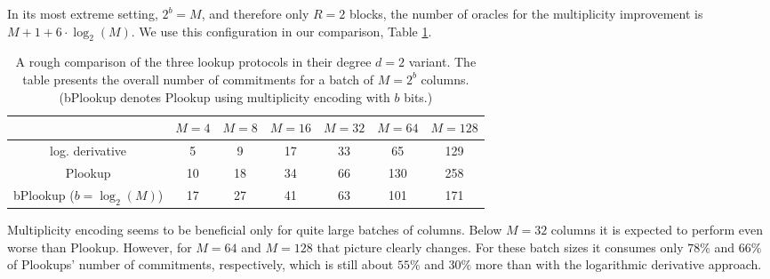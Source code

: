 \documentclass[11pt]{article}
\theoremstyle{definition}
\theoremstyle{definition}
\begin{document}
In its most extreme setting, $2^b = M$, and therefore only $R=2$ blocks, the number of oracles for the multiplicity improvement is 
$M + 1 + 6 \cdot\log_2(M)$.
We use this configuration in our comparison, Table \ref{tab:comparison:bPlookup}. 
 
\begin{table}
\caption{%
A rough comparison of the three lookup protocols in their degree $d=2$ variant.
The table presents the overall number of commitments for a batch of $M=2^b$ columns. 
(bPlookup denotes Plookup using multiplicity encoding with $b$ bits.) 
}
\label{tab:comparison:bPlookup}
\centering
\vspace*{0.5cm}
\begin{tabular}{|c|c|c|c|c|c|c|}
\cline{2-7}
\multicolumn{1}{c|}{} &$M = 4$ & $M=8$ & $M=16$ & $M=32$ & $M=64$ & $M=128$
\\\hline
log. derivative & 5 & 9 & 17 & 33 & 65 & 129
\\
Plookup & 10 & 18 & 34 & 66 & 130 & 258
\\
bPlookup ($b=\log_2(M)$) & 17 & 27 & 41 & 63 & 101 & 171
\\\hline
\end{tabular}
\end{table}

Multiplicity encoding seems to be beneficial only for quite large batches of columns. 
Below $M = 32$ columns it is expected to perform even worse than Plookup. 
However, for $M=64$ and $M=128$ that picture clearly changes.  
For these batch sizes it consumes only $78\%$ and $66\%$ of Plookups' number of commitments, respectively, which is still about $55\%$ and  $30\%$ more than with the logarithmic derivative approach.

\end{document}
